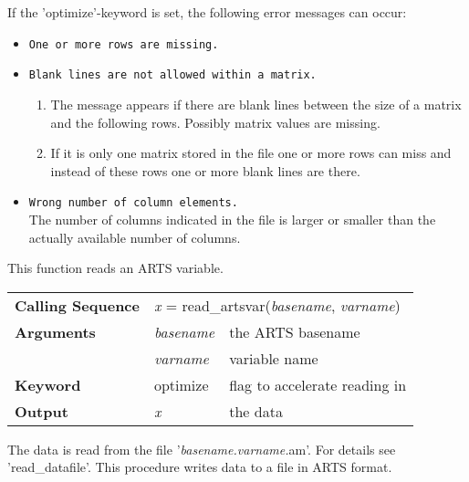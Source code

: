 If the 'optimize'-keyword is set, the following error messages can
occur:
\begin{itemize}
  \item \texttt{One or more rows are missing.}
  \item \texttt{Blank lines are not allowed within a matrix.}
        \begin{enumerate}
          \item The message appears if there are blank lines between
                the size of a matrix and the following rows. Possibly
                matrix values are missing.
          \item If it is only one matrix stored in the file one or
                more rows can miss and instead of these rows one or
                more blank lines are there.
        \end{enumerate}
  \item \texttt{Wrong number of column elements.} \\
        The number of columns indicated in the file is larger or
        smaller than the actually available number of columns.
\end{itemize}
This function reads an ARTS variable.
\begin{center}
\begin{tabular}{|l|ll|}
  \hline
  \textbf{Calling Sequence} &
  \multicolumn{2}{l|}{\textit{x} = %
  {\ttfamily read\_artsvar(\textnormal{\textit{basename}, %
                                       \textit{varname}})}}        \\
  \textbf{Arguments} & \textit{basename} & the ARTS basename       \\
                     & \textit{varname}  & variable name           \\
  \textbf{Keyword}   & optimize          & flag to accelerate reading
                                           in                      \\
  \textbf{Output}    & \textit{x}        & the data                \\
  \hline
\end{tabular}
\end{center}
The data is read from the file '\textit{basename.varname.}am'. For
details see 'read\_datafile'.
This procedure writes data to a file in ARTS format.
